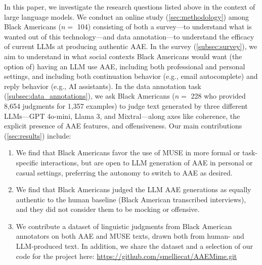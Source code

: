 In this paper, we investigate the research questions listed above in the context of large language models. We conduct an online study (\autoref{sec:methodology}) among Black Americans ($n=$ 104) consisting of both a survey---to understand what is wanted out of this technology---and data annotation---to understand the efficacy of current LLMs at producing authentic AAE.
In the survey (\autoref{subsec:survey}), we aim to understand in what social contexts Black Americans would want (the option of) having an LLM use AAE, including both professional and personal settings, and including both continuation behavior (e.g., email autocomplete) and reply behavior (e.g., AI assistants).
In the data annotation task (\autoref{subsec:data_annotations}), we ask Black Americans ($n=$ 228 who provided 8,654 judgments for 1,357 examples) to judge text generated by three different LLMs---GPT 4o-mini, Llama 3, and Mixtral---along axes like coherence, the explicit presence of AAE features, and offensiveness.
Our main contributions (\autoref{sec:results}) include:
\begin{enumerate}
\item We find that Black Americans favor the use of MUSE in more formal or task-specific interactions, but are open to LLM generation of AAE in personal or casual settings, preferring the autonomy to switch to AAE as desired.
\item We find that Black Americans judged the LLM AAE generations as equally authentic to the human baseline (Black American transcribed interviews), and they did not consider them to be mocking or offensive.
\item We contribute a dataset of linguistic judgments from Black American annotators on both AAE and MUSE texts, drawn both from human- and LLM-produced text. In addition, we share the dataset and a selection of our code for the project here: \url{https://github.com/smelliecat/AAEMime.git}
\end{enumerate}
